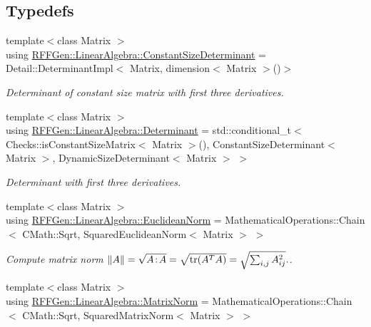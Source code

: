 \subsection*{Typedefs}
\begin{DoxyCompactItemize}
\item 
\hypertarget{group__LinearAlgebraGroup_ga3db2e748fee631cc5180eaf9d703e124}{{\footnotesize template$<$class Matrix $>$ }\\using \hyperlink{group__LinearAlgebraGroup_ga3db2e748fee631cc5180eaf9d703e124}{R\-F\-F\-Gen\-::\-Linear\-Algebra\-::\-Constant\-Size\-Determinant} = Detail\-::\-Determinant\-Impl$<$ Matrix, dimension$<$ Matrix $>$()$>$}\label{group__LinearAlgebraGroup_ga3db2e748fee631cc5180eaf9d703e124}

\begin{DoxyCompactList}\small\item\em Determinant of constant size matrix with first three derivatives. \end{DoxyCompactList}\item 
\hypertarget{group__LinearAlgebraGroup_gab9d32635f75364703a95fb0d00099168}{{\footnotesize template$<$class Matrix $>$ }\\using \hyperlink{group__LinearAlgebraGroup_gab9d32635f75364703a95fb0d00099168}{R\-F\-F\-Gen\-::\-Linear\-Algebra\-::\-Determinant} = std\-::conditional\-\_\-t$<$ Checks\-::is\-Constant\-Size\-Matrix$<$ Matrix $>$(), Constant\-Size\-Determinant$<$ Matrix $>$, Dynamic\-Size\-Determinant$<$ Matrix $>$ $>$}\label{group__LinearAlgebraGroup_gab9d32635f75364703a95fb0d00099168}

\begin{DoxyCompactList}\small\item\em Determinant with first three derivatives. \end{DoxyCompactList}\item 
\hypertarget{group__LinearAlgebraGroup_gaee2184589f2dddd26f00bd695ebcd577}{{\footnotesize template$<$class Matrix $>$ }\\using \hyperlink{group__LinearAlgebraGroup_gaee2184589f2dddd26f00bd695ebcd577}{R\-F\-F\-Gen\-::\-Linear\-Algebra\-::\-Euclidean\-Norm} = Mathematical\-Operations\-::\-Chain$<$ C\-Math\-::\-Sqrt, Squared\-Euclidean\-Norm$<$ Matrix $>$ $>$}\label{group__LinearAlgebraGroup_gaee2184589f2dddd26f00bd695ebcd577}

\begin{DoxyCompactList}\small\item\em Compute matrix norm $ \|A\| = \sqrt{A\negthinspace : \negthinspace A }= \sqrt{\mathrm{tr}(A^TA)} = \sqrt{\sum_{i,j} A_{ij}^2}. $. \end{DoxyCompactList}\item 
\hypertarget{group__LinearAlgebraGroup_gaa59381731a80fe009e56f86f78ebc703}{{\footnotesize template$<$class Matrix $>$ }\\using \hyperlink{group__LinearAlgebraGroup_gaa59381731a80fe009e56f86f78ebc703}{R\-F\-F\-Gen\-::\-Linear\-Algebra\-::\-Matrix\-Norm} = Mathematical\-Operations\-::\-Chain$<$ C\-Math\-::\-Sqrt, Squared\-Matrix\-Norm$<$ Matrix $>$ $>$}\label{group__LinearAlgebraGroup_gaa59381731a80fe009e56f86f78ebc703}


\end{DoxyCompactItemize}
